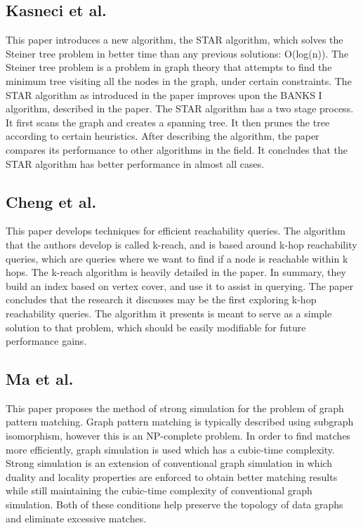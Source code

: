 \documentclass[11pt]{article}
\begin{document}
\subsection{Kasneci et al.}

This paper\cite{Star} introduces a new algorithm, the STAR algorithm, which solves the Steiner tree problem in better time than any previous solutions: O(log(n)). The Steiner tree problem is a problem in graph theory that attempts to find the minimum tree visiting all the nodes in the graph, under certain constraints. The STAR algorithm as introduced in the paper improves upon the BANKS I algorithm, described in the paper. The STAR algorithm has a two stage process. It first scans the graph and creates a spanning tree. It then prunes the tree according to certain heuristics. After describing the algorithm, the paper compares its performance to other algorithms in the field. It concludes that the STAR algorithm has better performance in almost all cases.

\subsection{Cheng et al.}

This paper\cite{Cheng} develops techniques for efficient reachability queries. The algorithm that the authors develop is called k-reach, and is based around k-hop reachability queries, which are queries where we want to find if a node is reachable within k hops. The k-reach algorithm is heavily detailed in the paper. In summary, they build an index based on vertex cover, and use it to assist in querying. The paper concludes that the research it discusses may be the first exploring k-hop reachability queries. The algorithm it presents is meant to serve as a simple solution to that problem, which should be easily modifiable for future performance gains.

\subsection{Ma et al.}

This paper \cite{Ma} proposes the method of strong simulation for the problem of graph pattern matching.  Graph pattern matching is typically described using subgraph isomorphism, however this is an NP-complete problem.  In order to find matches more efficiently, graph simulation is used which has a cubic-time complexity.  Strong simulation is an extension of conventional graph simulation in which duality and locality properties are enforced to obtain better matching results while still maintaining the cubic-time complexity of conventional graph simulation.  Both of these conditions help preserve the topology of data graphs and eliminate excessive matches.
\end{document}
